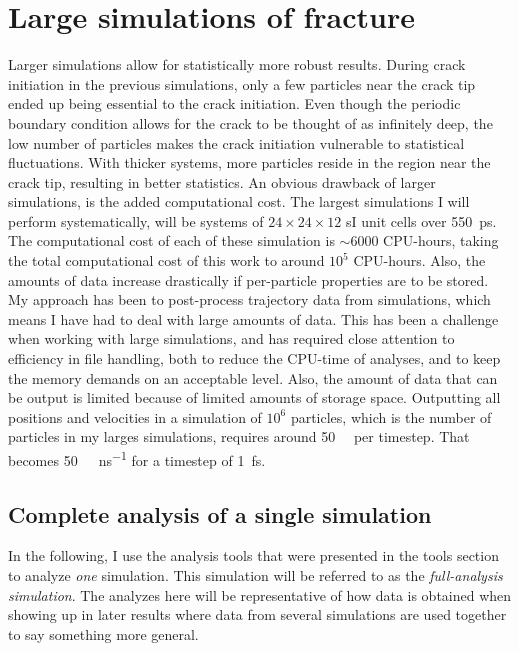 \section{Large simulations of fracture}
Larger simulations allow for statistically more robust results. During crack initiation in the previous simulations, only a few particles near the crack tip ended up being essential to the crack initiation. Even though the periodic boundary condition allows for the crack to be thought of as infinitely deep, the low number of particles makes the crack initiation vulnerable to statistical fluctuations. With thicker systems, more particles reside in the region near the crack tip, resulting in better statistics. An obvious drawback of larger simulations, is the added computational cost. The largest simulations I will perform systematically, will be systems of $24\times 24\times 12$ sI unit cells over \SI{550}{\pico\second}. The computational cost of each of these simulation is $\sim 6000$ CPU-hours, taking the total computational cost of this work to around $10^5$ CPU-hours. Also, the amounts of data increase drastically if per-particle properties are to be stored. My approach has been to post-process trajectory data from simulations, which means I have had to deal with large amounts of data. This has been a challenge when working with large simulations, and has required close attention to efficiency in file handling, both to reduce the CPU-time of analyses, and to keep the memory demands on an acceptable level. Also, the amount of data that can be output is limited because of limited amounts of storage space. Outputting all positions and velocities in a simulation of $10^6$ particles, which is the number of particles in my larges simulations, requires around \SI{50}{\mega\byte} per timestep. That becomes \SI{50}{\tera\byte\per\nano\second} for a timestep of \SI{1}{\femto\second}. 

\label{sec:complete_analysis_single_simulation}

\subsection{Complete analysis of a single simulation}
In the following, I use the analysis tools that were presented in the tools section to analyze \emph{one} simulation. This simulation will be referred to as the \emph{full-analysis simulation}. The analyzes here will be representative of how data is obtained when showing up in later results where data from several simulations are used together to say something more general.

